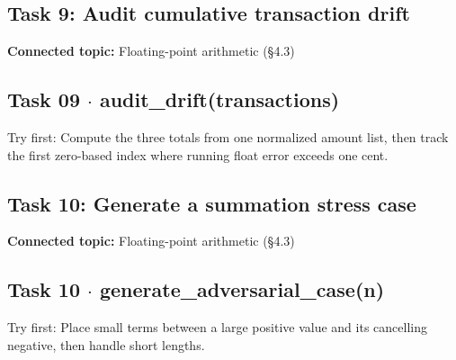 \documentclass[11pt]{article}
\begin{document}
\begin{keepsection}
\section{Task 9: Audit cumulative transaction drift}

\textbf{Connected topic:} Floating-point arithmetic (§4.3)

\begin{keepsection}
\subsection{Task 09 \ensuremath{\cdot} audit\_drift(transactions)}

Try first: Compute the three totals from one normalized amount list, then track the first zero-based index where running float error exceeds one cent.

\end{keepsection}
\end{keepsection}

\begin{keepsection}
\section{Task 10: Generate a summation stress case}

\textbf{Connected topic:} Floating-point arithmetic (§4.3)

\begin{keepsection}
\subsection{Task 10 \ensuremath{\cdot} generate\_adversarial\_case(n)}

Try first: Place small terms between a large positive value and its cancelling negative, then handle short lengths.

\end{keepsection}
\end{keepsection}


\clearpage
\end{document}
